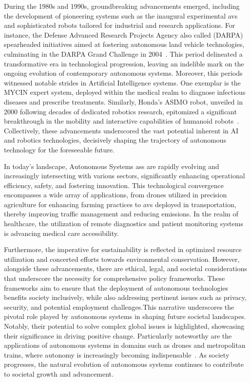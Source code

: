 During the 1980s and 1990s, groundbreaking advancements emerged, including the development of pioneering systems such as the inaugural experimental \glspl{av} and sophisticated robots tailored for industrial and research applications. For instance, the Defense Advanced Research Projects Agency also called (DARPA) spearheaded initiatives aimed at fostering autonomous land vehicle technologies, culminating in the DARPA Grand Challenge in 2004~\cite{atkeson2018happened}. This period delineated a transformative era in technological progression, leaving an indelible mark on the ongoing evolution of contemporary autonomous systems. 
Moreover, this periods witnessed notable strides in Artificial Intelligence systems. One exemplar is the MYCIN expert system, deployed within the medical realm to diagnose infectious diseases and prescribe treatments. Similarly, Honda's ASIMO robot, unveiled in 2000 following decades of dedicated robotics research, epitomized a significant breakthrough in the mobility and interactive capabilities of humanoid robots~\cite{sakagami2002intelligent}. Collectively, these advancements underscored the vast potential inherent in AI and robotics technologies, decisively shaping the trajectory of autonomous technology for the foreseeable future.

In today's landscape, Autonomous Systems \glspl{as} are rapidly evolving and increasingly intersecting with various sectors, significantly enhancing operational efficiency, safety, and fostering innovation. This technological convergence encompasses a wide array of applications, from drones utilized in precision agriculture for enhancing farming practices to \glspl{av} deployed in transportation, thereby improving traffic management and reducing emissions. In the realm of healthcare, the utilization of remote diagnostics and patient monitoring systems is advancing medical care accessibility.

Furthermore, the imperative for sustainability is reflected in optimized resource utilization and concerted efforts towards environmental conservation. However, alongside these advancements, there are ethical, legal, and societal considerations that underscore the necessity for comprehensive policy frameworks. These frameworks aim to ensure that the deployment of autonomous technologies benefits society inclusively, while also addressing pertinent issues such as privacy, security, and potential employment challenges.This narrative underscores the pivotal role played by autonomous systems in shaping future societal landscapes. Notably, their potential to solve complex global issues is highlighted, showcasing their significance in driving positive change. Particularly noteworthy are the applications of autonomous systems in domains such as drones and metropolitan trains, where autonomy is increasingly becoming indispensable~\cite{chen2021automation}. As society progresses, the natural evolution of autonomous systems continues to contribute to societal growth and advancement.


